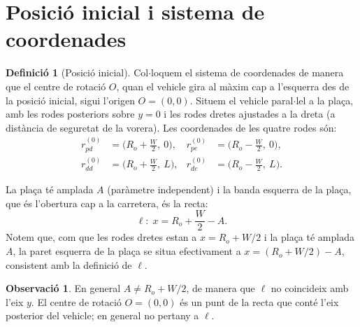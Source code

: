 \documentclass[11pt, a4paper]{article}
\theoremstyle{plain}
\theoremstyle{definition}
\newtheorem{definition}[theorem]{Definici\'o}
\newtheorem{remark}[theorem]{Observaci\'o}
\newcommand{\Ro}{R_o}
\begin{document}
\section{Posici\'o inicial i sistema de coordenades}\label{sec:posicio}

\begin{definition}[Posici\'o inicial]\label{def:posinicial}
Col$\cdot$loquem el sistema de coordenades de manera que el centre de rotaci\'o
$O$, quan el vehicle gira al m\`axim cap a l'esquerra des de la posici\'o
inicial, sigui l'origen $O=(0,0)$. Situem el vehicle paral$\cdot$lel a la
pla\c{c}a, amb les rodes posteriors sobre $y=0$ i les rodes dretes ajustades
a la dreta (a dist\`ancia de seguretat de la vorera). Les coordenades de les
quatre rodes s\'on:
\begin{align*}
  r_{pd}^{(0)}&=\bigl(\Ro+\tfrac{W}{2},\ 0\bigr), &
  r_{pe}^{(0)}&=\bigl(\Ro-\tfrac{W}{2},\ 0\bigr),\\
  r_{dd}^{(0)}&=\bigl(\Ro+\tfrac{W}{2},\ L\bigr), &
  r_{de}^{(0)}&=\bigl(\Ro-\tfrac{W}{2},\ L\bigr).
\end{align*}
\end{definition}

La pla\c{c}a t\'e amplada $A$ (par\`ametre independent) i la banda esquerra
de la pla\c{c}a, que \'es l'obertura cap a la carretera, \'es la recta:
\[
  \ell:\; x = \Ro+\frac{W}{2}-A.
\]
Notem que, com que les rodes dretes estan a $x=\Ro+W/2$ i la pla\c{c}a
t\'e amplada $A$, la paret esquerra de la pla\c{c}a se situa efectivament
a $x = (\Ro+W/2) - A$, consistent amb la definici\'o de $\ell$.

\begin{remark}
En general $A\neq \Ro+W/2$, de manera que $\ell$ no coincideix amb l'eix
$y$. El centre de rotaci\'o $O=(0,0)$ \'es un punt de la recta que cont\'e
l'eix posterior del vehicle; en general no pertany a $\ell$.
\end{remark}
\end{document}
